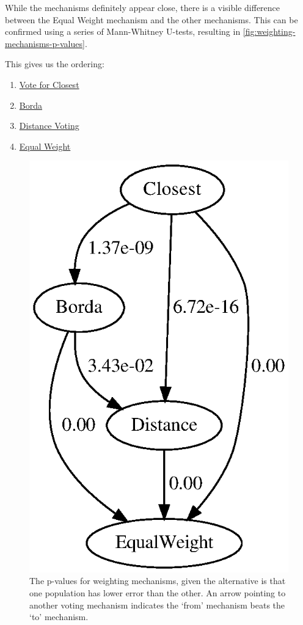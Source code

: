 While the mechanisms definitely appear close, there is a visible difference between
the Equal Weight mechanism and the other mechanisms.
This can be confirmed using a series of Mann-Whitney U-tests, resulting in
\autoref{fig:weighting-mechanisms-p-values}.
\begin{samepage}
    This gives us the ordering:
    \begin{enumerate}
        \item \hyperref[para:closest]{Vote for Closest}
        \item \hyperref[para:borda]{Borda}
        \item \hyperref[para:distance-voting]{Distance Voting}
        \item \hyperref[para:equal-weight]{Equal Weight}
    \end{enumerate}
\end{samepage}

\begin{figure}[htbp]
    \centering
    \includegraphics[scale=0.75]
    {./content/figures/weighting_mechanisms/weighting-mechanisms-p-values.gv}
    \caption{The p-values for weighting mechanisms, given the alternative is that one
    population has lower error than the other.
    An arrow pointing to another voting mechanism indicates the `from' mechanism
    beats the `to' mechanism.}
    \label{fig:weighting-mechanisms-p-values}
\end{figure}

